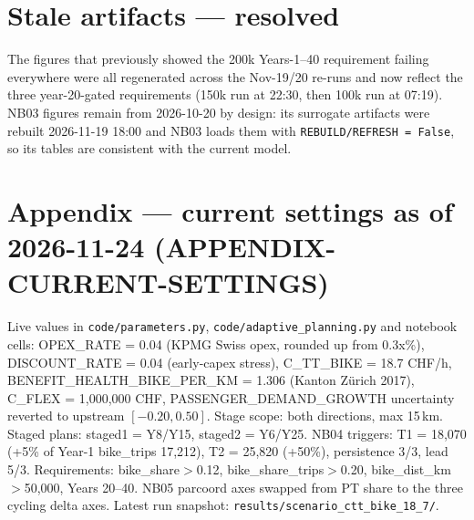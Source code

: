 \documentclass[11pt,a4paper]{article}
\begin{document}
\section{Stale artifacts --- resolved}
The figures that previously showed the 200k Years-1--40 requirement failing everywhere
were all regenerated across the Nov-19/20 re-runs and now reflect the three
year-20-gated requirements (150k run at 22:30, then 100k run at 07:19). NB03 figures
remain from 2026-10-20 by design: its surrogate artifacts were rebuilt 2026-11-19
18:00 and NB03 loads them with \texttt{REBUILD/REFRESH = False}, so its tables are
consistent with the current model.


\section*{Appendix --- current settings as of 2026-11-24 (APPENDIX-CURRENT-SETTINGS)}
Live values in \texttt{code/parameters.py}, \texttt{code/adaptive\_planning.py} and notebook cells: OPEX\_RATE = 0.04 (KPMG Swiss opex, rounded up from 0.3x\%), DISCOUNT\_RATE = 0.04 (early-capex stress), C\_TT\_BIKE = 18.7 CHF/h, BENEFIT\_HEALTH\_BIKE\_PER\_KM = 1.306 (Kanton Z\"urich 2017), C\_FLEX = 1{,}000{,}000 CHF, PASSENGER\_DEMAND\_GROWTH uncertainty reverted to upstream $[-0.20, 0.50]$. Stage scope: both directions, max 15\,km. Staged plans: staged1 = Y8/Y15, staged2 = Y6/Y25. NB04 triggers: T1 = 18{,}070 (+5\% of Year-1 bike\_trips 17{,}212), T2 = 25{,}820 (+50\%), persistence 3/3, lead 5/3. Requirements: bike\_share${>}$0.12, bike\_share\_trips${>}$0.20, bike\_dist\_km${>}$50{,}000, Years 20--40. NB05 parcoord axes swapped from PT share to the three cycling delta axes. Latest run snapshot: \texttt{results/scenario\_ctt\_bike\_18\_7/}.
\end{document}
